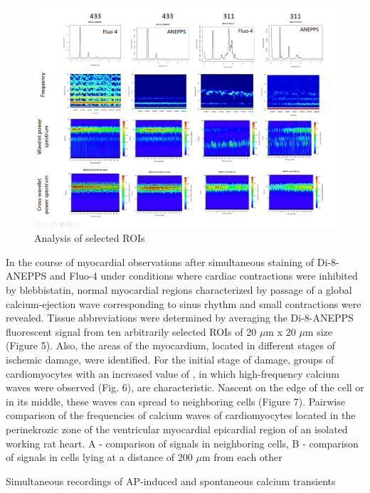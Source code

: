 \documentclass{biophys-new}
\begin{document}
\begin{figure}[hbt!]
\centering
\includegraphics[width=0.9\linewidth]{fig9.png}
\caption{ Analysis of selected ROIs }
\label{fig:fig9}
\end{figure}


In the course of myocardial observations after simultaneous staining of Di-8-ANEPPS and Fluo-4 under conditions where cardiac contractions were inhibited by blebbistatin, normal myocardial regions characterized by passage of a global calcium-ejection wave corresponding to sinus rhythm and small contractions were revealed. Tissue abbreviations were determined by averaging the Di-8-ANEPPS fluorescent signal from ten arbitrarily selected ROIs of 20 $\mu$m x 20 $\mu$m size (Figure 5). Also, the areas of the myocardium, located in different stages of ischemic damage, were identified. For the initial stage of damage, groups of cardiomyocytes with an increased value of , in which high-frequency calcium waves were observed (Fig. 6), are characteristic. Nascent on the edge of the cell or in its middle, these waves can spread to neighboring cells (Figure 7).
Pairwise comparison of the frequencies of calcium waves of cardiomyocytes located in the perinekrozic zone of the ventricular myocardial epicardial region of an isolated working rat heart. A - comparison of signals in neighboring cells, B - comparison of signals in cells lying at a distance of 200 $\mu$m from each other

Simultaneous recordings of AP-induced and spontaneous calcium transients
\end{document}
